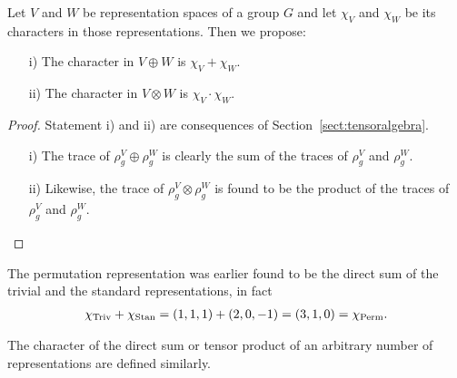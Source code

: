 \begin{proposition}\label{prop:charplustimes}
	Let $V$ and $W$ be representation spaces of a group $G$ and let $\chi_V$ and $\chi_W$ be its characters in those representations. Then we propose:
	\begin{enumerate}
		\item[i)] The character in $V \oplus W$ is $\chi_V+\chi_W$.
		\item[ii)] The character in $V \otimes W$ is $\chi_V \cdot \chi_W$.
	\end{enumerate}
\end{proposition}
\begin{proof}
	Statement i) and ii) are consequences of Section~\ref{sect:tensoralgebra}. 
	\begin{enumerate}
		\item[i)] The trace of $\rho_g^V \oplus \rho_g^W$ is clearly the sum of the traces of $\rho_g^V$ and $\rho_g^W$.
		\item[ii)] Likewise, the trace of $\rho_g^V \otimes \rho_g^W$ is found to be the product of the traces of $\rho_g^V$ and $\rho_g^W$.\qedhere
	\end{enumerate}
\end{proof}

\begin{example}[$\Sym_3$]
	The permutation representation was earlier found to be the direct sum of the trivial and the standard representations, in fact
	\begin{align*}
		\chi_{\text{Triv}} + \chi_{\text{Stan}} = (1,1,1) + (2,0,-1) = (3,1,0) = \chi_{\text{Perm}}.
	\end{align*}
\end{example}

The character of the direct sum or tensor product of an arbitrary number of representations are defined similarly.

